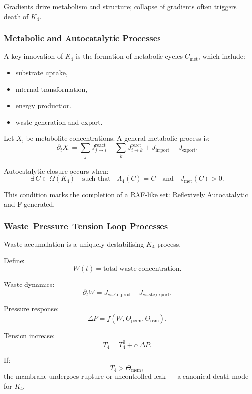 Gradients drive metabolism and structure; collapse of gradients often 
triggers death of $K_4$.

\subsubsection{Metabolic and Autocatalytic Processes}

A key innovation of $K_4$ is the formation of metabolic cycles 
$C_\text{met}$, which include:
\begin{itemize}
    \item substrate uptake,
    \item internal transformation,
    \item energy production,
    \item waste generation and export.
\end{itemize}

Let $X_i$ be metabolite concentrations.  
A general metabolic process is:
\[
\partial_t X_i = 
\sum_j J_{j \to i}^{\text{react}} 
    - \sum_k J_{i \to k}^{\text{react}}
    + J_{\text{import}} - J_{\text{export}}.
\]

Autocatalytic closure occurs when:
\[
\exists\, C \subset \Omega(K_4)
\quad\text{such that}\quad 
\Lambda_4(C) = C \quad\text{and}\quad J_{\text{met}}(C) > 0.
\]

This condition marks the completion of a RAF-like set:
Reflexively Autocatalytic and F-generated.

\subsubsection{Waste–Pressure–Tension Loop Processes}

Waste accumulation is a uniquely destabilising $K_4$ process.

Define:
\[
W(t) = \text{total waste concentration}.
\]

Waste dynamics:
\[
\partial_t W = J_{\text{waste,prod}} - J_{\text{waste,export}}.
\]

Pressure response:
\[
\Delta P = f(W, \Theta_{\text{perm}}, \Theta_{\text{osm}}).
\]

Tension increase:
\[
T_4 = T_4^0 + \alpha\, \Delta P.
\]

If:
\[
T_4 > \Theta_{\text{mem}},
\]
the membrane undergoes rupture or uncontrolled leak — a canonical death 
mode for $K_4$.

